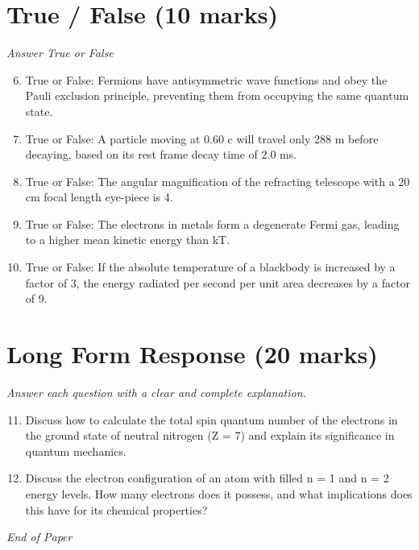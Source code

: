 \documentclass[12pt]{article}
\begin{document}
\section*{True / False (10 marks)}
\textit{Answer True or False}
\begin{enumerate}[label=\arabic*.]
\setcounter{enumi}{5}
\item True or False: Fermions have antisymmetric wave functions and obey the Pauli exclusion principle, preventing them from occupying the same quantum state.
\item True or False: A particle moving at 0.60 c will travel only 288 m before decaying, based on its rest frame decay time of 2.0 ms.
\item True or False: The angular magnification of the refracting telescope with a 20 cm focal length eye-piece is 4.
\item True or False: The electrons in metals form a degenerate Fermi gas, leading to a higher mean kinetic energy than kT.
\item True or False: If the absolute temperature of a blackbody is increased by a factor of 3, the energy radiated per second per unit area decreases by a factor of 9.
\end{enumerate}

\section*{Long Form Response (20 marks)}
\textit{Answer each question with a clear and complete explanation.}
\begin{enumerate}[label=\arabic*.]
\setcounter{enumi}{10}
\item Discuss how to calculate the total spin quantum number of the electrons in the ground state of neutral nitrogen (Z = 7) and explain its significance in quantum mechanics.
\item Discuss the electron configuration of an atom with filled n = 1 and n = 2 energy levels. How many electrons does it possess, and what implications does this have for its chemical properties?
\end{enumerate}

\vfill
\noindent\textit{End of Paper}
\end{document}
